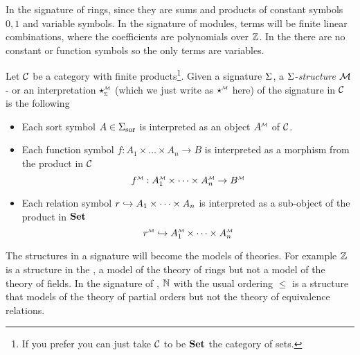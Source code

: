 \begin{eg}
    In the signature of rings, 
    since they are sums and products of constant symbols $0, 1$ and 
    variable symbols.
    In the signature of modules, 
    terms will be finite linear combinations,
    where the coefficients are polynomials over $\mathbb{Z}$.
    In the  
    there are no constant or function symbols so the only terms are variables.
\end{eg}

\begin{dfn}
    Let $\mathcal{C}$ be a category with finite products\footnote{
        If you prefer you can just take $\mathcal{C}$ to be $\mathbf{Set}$
        the category of sets.}.
    Given a signature $\Sigma$, a $\Sigma$-\textit{structure} $\mathcal{M}$ 
    - or an interpretation $\intp{\Si}{\MM}$ 
    (which we just write as $\mmintp{\star}$ here)
    of the signature in $\mathcal{C}$ is the following
    \begin{itemize}
        \item Each sort symbol $A \in {\Sigma}_\mathrm{sor}$ 
        is interpreted as an object $\mmintp{A}$ of $\mathcal{C}$.
        \item Each function symbol $f : A_1 \times \dots \times A_n \to B$ 
        is interpreted as a morphism from the product in $\mathcal{C}$
        \[\mmintp{f} : \mmintp{A_1} 
        \times \dots \times \mmintp{A_n}  \to \mmintp{B}\]
        \item Each relation symbol $r \hookrightarrow A_1 \times \dots \times A_n$
        is interpreted as a sub-object of the product in $\mathbf{Set}$
        \[\mmintp{r} \hookr \mmintp{A_1} 
        \times \dots \times \mmintp{A_n}\]
    \end{itemize}
\end{dfn}

The structures in a signature will become the models of theories.
For example $\mathbb{Z}$ is a structure in the , 
a model of the theory of rings but not a model of the theory of fields.
In the signature of , 
$\mathbb{N}$ with the usual ordering $\leq$ is a structure that models of 
the theory of partial orders but not the theory of equivalence relations.

